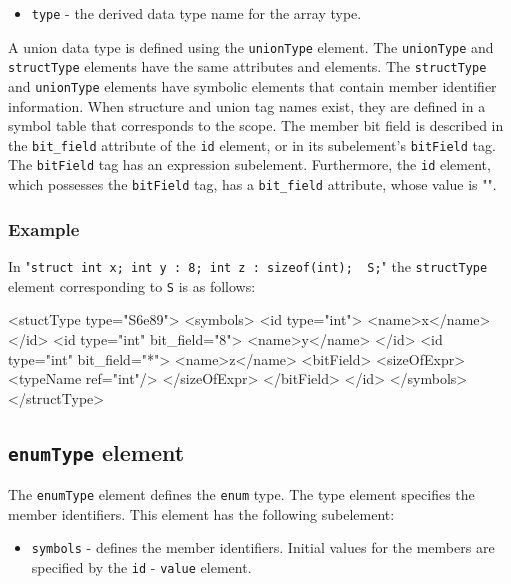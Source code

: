 \begin{itemize}
\item {\tt type} - the derived data type name for the array type.
\end{itemize}

A union data type is defined using the {\tt unionType} element. The {\tt unionType} and {\tt structType} elements have the same attributes and elements.
The {\tt structType} and {\tt unionType} elements have symbolic elements that contain member identifier information. When structure and union tag names exist, they are defined in a symbol table that corresponds to the scope.
The member bit field is described in the {\tt bit\_field} attribute of the {\tt id} element, or in its subelement's {\tt bitField} tag. The {\tt bitField} tag has an expression subelement. Furthermore, the {\tt id} element, which possesses the {\tt bitField} tag, has a {\tt bit\_field} attribute, whose value is "{\tt *}". 

\subsubsection*{Example}

In "{\tt struct {int x; int y : 8; int z : sizeof(int); } S;}" the {\tt structType} element corresponding to {\tt S} is as follows:

\begin{XcodeMLExample}
  <stuctType type="S6e89">
    <symbols>
      <id type="int">
        <name>x</name>
      </id>
      <id type="int" bit_field="8">
        <name>y</name>
      </id>
      <id type="int" bit_field="*">
        <name>z</name>
        <bitField>
          <sizeOfExpr>
            <typeName ref="int"/>
          </sizeOfExpr>
        </bitField>
      </id>
     </symbols>
  </structType>
\end{XcodeMLExample}


\subsection{ {\tt enumType} element}

The {\tt enumType} element defines the {\tt enum} type. The type element specifies the member identifiers.
This element has the following subelement:

\begin{itemize}
\item {\tt symbols} - defines the member identifiers. Initial values for the members are specified by the {\tt id} - {\tt value} element.
\end{itemize}

